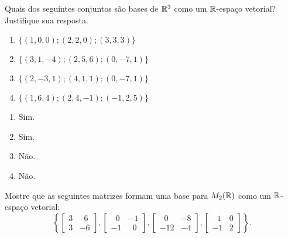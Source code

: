 \documentclass[12pt]{exam}
\begin{document}
    \begin{exercicio}
        Quais dos seguintes conjuntos são bases de $\mathbb{R}^3$ como um $\mathbb{R}$-espaço vetorial? Justifique sua resposta.
        \begin{multicols}{2}
            \begin{enumerate}[label={\alph*})]
                \item $\{(1, 0, 0); (2, 2, 0); (3, 3, 3)\}$

                \item $\{(3, 1, -4); (2, 5, 6); (0, -7, 1)\}$

                \item $\{(2, -3, 1); (4, 1, 1); (0, -7, 1)\}$

                \item $\{(1, 6, 4); (2, 4, -1); (-1, 2, 5)\}$
            \end{enumerate}
        \end{multicols}
        \begin{solucao}
            \begin{enumerate}[label={\alph*})]
                \item Sim.

                \item Sim.

                \item Não.

                \item Não.
            \end{enumerate}
        \end{solucao}
    \end{exercicio}

    \begin{exercicio}
        Mostre que as seguintes matrizes formam uma base para $M_2(\mathbb{R})$ como um $\mathbb{R}$-espaço vetorial:
        \[
            \left\{
                \begin{bmatrix}
                    3 & \phantom{x} 6\\
                    3 & -6
                \end{bmatrix},
                \begin{bmatrix}
                    \phantom{x} 0 & -1\\
                    -1 & \phantom{x} 0
                \end{bmatrix},
                \begin{bmatrix}
                    \phantom{x} 0 & -8\\
                    -12 & -4
                \end{bmatrix},
                \begin{bmatrix}
                    \phantom{x} 1 & 0\\
                    -1 & 2
                \end{bmatrix}
            \right\}.
        \]
    \end{exercicio}
\end{document}
